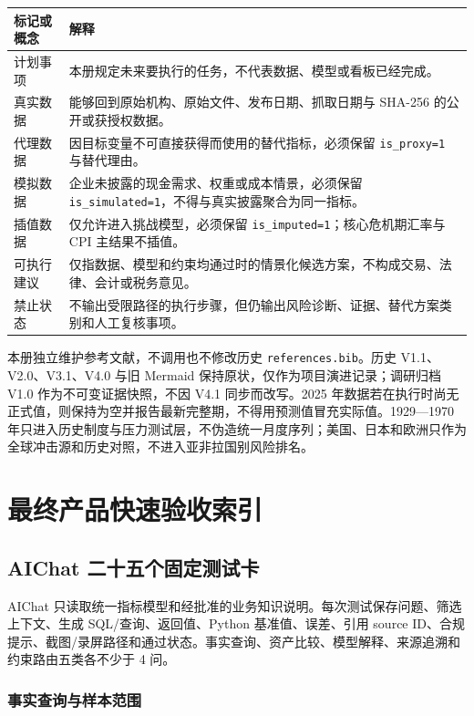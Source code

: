 \documentclass[UTF8,fontset=windows,12pt,openany]{ctexbook}
\newcommand{\Field}[1]{{\small\nolinkurl{#1}}}
\newcommand{\File}[1]{{\small\begingroup\urlstyle{same}\nolinkurl{#1}\endgroup}}
\begin{document}
\begin{longtable}{p{3.0cm}p{10.5cm}}
\toprule
\textbf{标记或概念} & \textbf{解释}\\
\midrule
计划事项 & 本册规定未来要执行的任务，不代表数据、模型或看板已经完成。\\
真实数据 & 能够回到原始机构、原始文件、发布日期、抓取日期与 SHA-256 的公开或获授权数据。\\
代理数据 & 因目标变量不可直接获得而使用的替代指标，必须保留 \Field{is_proxy=1} 与替代理由。\\
模拟数据 & 企业未披露的现金需求、权重或成本情景，必须保留 \Field{is_simulated=1}，不得与真实披露聚合为同一指标。\\
插值数据 & 仅允许进入挑战模型，必须保留 \Field{is_imputed=1}；核心危机期汇率与 CPI 主结果不插值。\\
可执行建议 & 仅指数据、模型和约束均通过时的情景化候选方案，不构成交易、法律、会计或税务意见。\\
禁止状态 & 不输出受限路径的执行步骤，但仍输出风险诊断、证据、替代方案类别和人工复核事项。\\
\bottomrule
\end{longtable}

本册独立维护参考文献，不调用也不修改历史 \File{references.bib}。历史 V1.1、V2.0、V3.1、V4.0 与旧 Mermaid 保持原状，仅作为项目演进记录；调研归档 V1.0 作为不可变证据快照，不因 V4.1 同步而改写。2025 年数据若在执行时尚无正式值，则保持为空并报告最新完整期，不得用预测值冒充实际值。1929—1970 年只进入历史制度与压力测试层，不伪造统一月度序列；美国、日本和欧洲只作为全球冲击源和历史对照，不进入亚非拉国别风险排名。

\tableofcontents
\listoftables

\mainmatter
\part{最终产品快速验收索引}

\chapter{AIChat 二十五个固定测试卡}

AIChat 只读取统一指标模型和经批准的业务知识说明。每次测试保存问题、筛选上下文、生成 SQL/查询、返回值、Python 基准值、误差、引用 source ID、合规提示、截图/录屏路径和通过状态。事实查询、资产比较、模型解释、来源追溯和约束路由五类各不少于 4 问。

\section{事实查询与样本范围}
\end{document}
